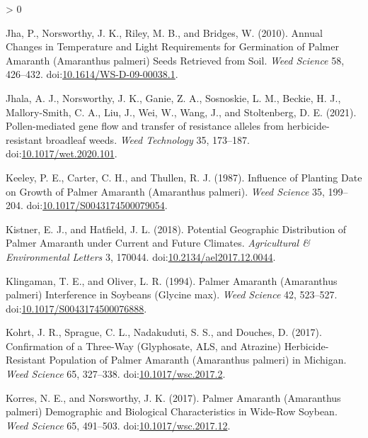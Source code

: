 \documentclass[utf8]{frontiersSCNS}
\newlength{\cslhangindent}
\newenvironment{CSLReferences}[2] %
 {%
  \setlength{\parindent}{0pt}
  \ifodd #1 \everypar{\setlength{\hangindent}{\cslhangindent}}\ignorespaces\fi
  \ifnum #2 > 0
  \setlength{\parskip}{#2\baselineskip}
  \fi
 }%
 {}
\begin{document}
\begin{CSLReferences}{1}{0}
\leavevmode\hypertarget{ref-jha2010}{}%
Jha, P., Norsworthy, J. K., Riley, M. B., and Bridges, W. (2010). Annual
{Changes} in {Temperature} and {Light Requirements} for {Germination} of
{Palmer Amaranth} ({Amaranthus} palmeri) {Seeds Retrieved} from {Soil}.
\emph{Weed Science} 58, 426--432.
doi:\href{https://doi.org/10.1614/WS-D-09-00038.1}{10.1614/WS-D-09-00038.1}.

\leavevmode\hypertarget{ref-jhala2021}{}%
Jhala, A. J., Norsworthy, J. K., Ganie, Z. A., Sosnoskie, L. M., Beckie,
H. J., Mallory-Smith, C. A., Liu, J., Wei, W., Wang, J., and
Stoltenberg, D. E. (2021). Pollen-mediated gene flow and transfer of
resistance alleles from herbicide-resistant broadleaf weeds. \emph{Weed
Technology} 35, 173--187.
doi:\href{https://doi.org/10.1017/wet.2020.101}{10.1017/wet.2020.101}.

\leavevmode\hypertarget{ref-keeley1987}{}%
Keeley, P. E., Carter, C. H., and Thullen, R. J. (1987). Influence of
{Planting Date} on {Growth} of {Palmer Amaranth} ({Amaranthus} palmeri).
\emph{Weed Science} 35, 199--204.
doi:\href{https://doi.org/10.1017/S0043174500079054}{10.1017/S0043174500079054}.

\leavevmode\hypertarget{ref-kistner2018}{}%
Kistner, E. J., and Hatfield, J. L. (2018). Potential {Geographic
Distribution} of {Palmer Amaranth} under {Current} and {Future
Climates}. \emph{Agricultural \& Environmental Letters} 3, 170044.
doi:\href{https://doi.org/10.2134/ael2017.12.0044}{10.2134/ael2017.12.0044}.

\leavevmode\hypertarget{ref-klingaman1994}{}%
Klingaman, T. E., and Oliver, L. R. (1994). Palmer {Amaranth}
({Amaranthus} palmeri) {Interference} in {Soybeans} ({Glycine} max).
\emph{Weed Science} 42, 523--527.
doi:\href{https://doi.org/10.1017/S0043174500076888}{10.1017/S0043174500076888}.

\leavevmode\hypertarget{ref-kohrt2017}{}%
Kohrt, J. R., Sprague, C. L., Nadakuduti, S. S., and Douches, D. (2017).
Confirmation of a {Three}-{Way} ({Glyphosate}, {ALS}, and {Atrazine})
{Herbicide}-{Resistant Population} of {Palmer Amaranth} ({Amaranthus}
palmeri) in {Michigan}. \emph{Weed Science} 65, 327--338.
doi:\href{https://doi.org/10.1017/wsc.2017.2}{10.1017/wsc.2017.2}.

\leavevmode\hypertarget{ref-korres2017a}{}%
Korres, N. E., and Norsworthy, J. K. (2017). Palmer {Amaranth}
({Amaranthus} palmeri) {Demographic} and {Biological Characteristics} in
{Wide}-{Row Soybean}. \emph{Weed Science} 65, 491--503.
doi:\href{https://doi.org/10.1017/wsc.2017.12}{10.1017/wsc.2017.12}.


\end{CSLReferences}
\end{document}
